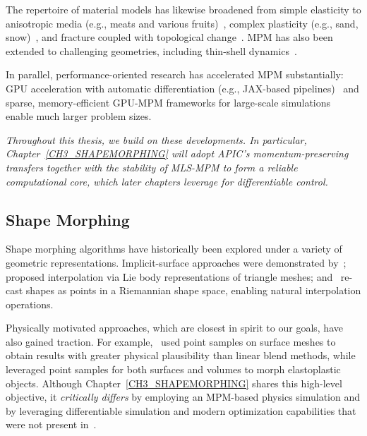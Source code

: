     The repertoire of material models has likewise broadened from simple elasticity to anisotropic media (e.g., meats and various fruits)~\citep{10.1145/3386569.3392428}, complex plasticity (e.g., sand, snow)~\citep{2019-cdmpm}, and fracture coupled with topological change~\citep{wang2020massively}. MPM has also been extended to challenging geometries, including thin-shell dynamics~\citep{guo2018material}.
    
    In parallel, performance-oriented research has accelerated MPM substantially: GPU acceleration with automatic differentiation (e.g., JAX-based pipelines)~\citep{du2025jax} and sparse, memory-efficient GPU-MPM frameworks for large-scale simulations~\citep{chen2025sparse} enable much larger problem sizes.
    
    \emph{Throughout this thesis, we build on these developments. In particular, Chapter~\ref{CH3_SHAPEMORPHING} will adopt APIC’s momentum-preserving transfers together with the stability of MLS-MPM to form a reliable computational core, which later chapters leverage for differentiable control.}

\subsection{Shape Morphing}
    Shape morphing algorithms have historically been explored under a variety of geometric representations. Implicit-surface approaches were demonstrated by~\citep{turk2005shape, breen2001level}; \citep{bansal2018lie} proposed interpolation via Lie body representations of triangle meshes; and~\citep{kilian2007geometric} re-cast shapes as points in a Riemannian shape space, enabling natural interpolation operations.
    
    Physically motivated approaches, which are closest in spirit to our goals, have also gained traction. For example,~\citep{bao2005physically} used point samples on surface meshes to obtain results with greater physical plausibility than linear blend methods, while~\citep{muller2004point} leveraged point samples for both surfaces and volumes to morph elastoplastic objects. Although Chapter~\ref{CH3_SHAPEMORPHING} shares this high-level objective, it \emph{critically differs} by employing an MPM-based physics simulation and by leveraging differentiable simulation and modern optimization capabilities that were not present in~\citep{muller2004point}.
    
